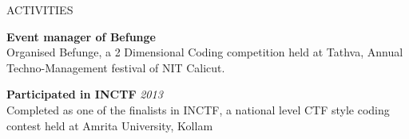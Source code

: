 \documentclass{resume} %
\begin{document}
\begin{rSection}{ACTIVITIES}

{\bf Event manager of Befunge} \\ 
Organised Befunge, a 2 Dimensional Coding competition held at Tathva, Annual Techno-Management festival of NIT Calicut. 

{\bf Participated in INCTF} \hfill {\em 2013} \\ 
Completed as one of the finalists in INCTF, a national level CTF style coding contest held at Amrita University, Kollam


\end{rSection}




\end{document}
